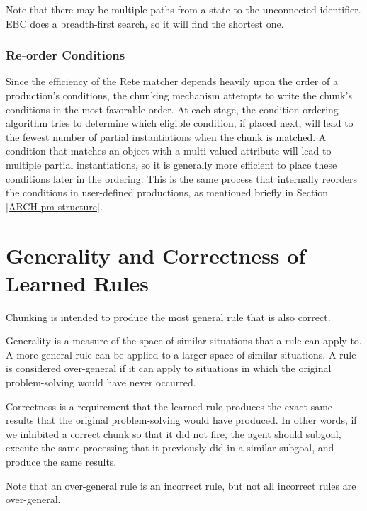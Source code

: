 Note that there may be multiple paths from a state to the unconnected identifier.  EBC does a breadth-first search, so it will find the shortest one.  

\subsubsection{Re-order Conditions}

Since the efficiency of the Rete matcher depends heavily upon the order of a production's conditions, the chunking mechanism attempts to write the chunk's conditions in the most favorable order. At each stage, the condition-ordering algorithm tries to determine which eligible condition, if placed next, will lead to the fewest number of partial instantiations when the chunk is matched. A condition that matches an object with a multi-valued attribute will lead to multiple partial instantiations, so it is generally more efficient to place these conditions later in the ordering.  This is the same process that internally reorders the conditions in user-defined productions, as mentioned briefly in Section \ref{ARCH-pm-structure}.


\section{Generality and Correctness of Learned Rules}
\label{CHUNKING-correctness}

Chunking is intended to produce the most general rule that is also correct. 

Generality is a measure of the space of similar situations that a rule can apply to.  A more general rule can be applied to a larger space of similar situations.  A rule is considered over-general if it can apply to situations in which the original problem-solving would have never occurred.  

Correctness is a requirement that the learned rule produces the exact same results that the original problem-solving would have produced.  In other words, if we inhibited a correct chunk so that it did not fire, the agent should subgoal, execute the same processing that it previously did in a similar subgoal, and produce the same results.

Note that an over-general rule is an incorrect rule, but not all incorrect rules are over-general.  


